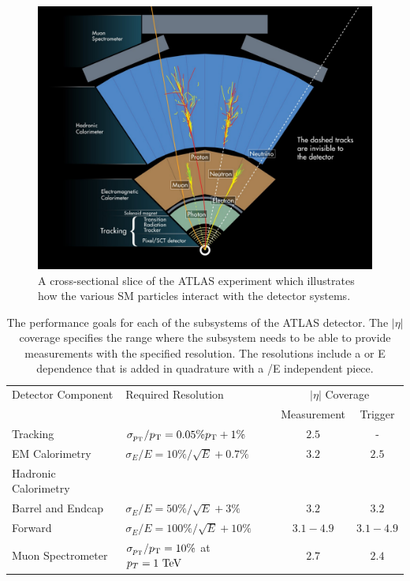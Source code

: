 \begin{figure}[hbtp]
\includegraphics[width=\fullfig]{figures/particle_interactions.png}
\caption{A cross-sectional slice of the ATLAS experiment which illustrates how the various \ac{SM} particles interact with the detector systems.}
\label{fig:particle_interactions}
\end{figure}

\begin{table}
\centering
\begin{tabular}{llcc}
  \hline
  Detector Component & Required Resolution & \multicolumn{2}{c}{$|\eta|$ Coverage} \\
                     &                     & Measurement & Trigger \\
  \hline
  Tracking & $\sigma_{p_{\mathrm{T}}}/p_{\mathrm{T}} = 0.05\% p_{\mathrm{T}} + 1\%$ & $2.5$ & - \\
  EM Calorimetry & $\sigma_{E}/E = 10\%/\sqrt{E} + 0.7\%$ & $3.2$ & $2.5$ \\
  Hadronic Calorimetry & & \\
  \quad Barrel and Endcap & $\sigma_{E}/E = 50\%/\sqrt{E} + 3\%$ & $3.2$ & $3.2$ \\
  \quad Forward & $\sigma_{E}/E = 100\%/\sqrt{E} + 10\%$ & $3.1 - 4.9$ & $3.1 - 4.9$ \\
  Muon Spectrometer & $\sigma_{p_{\mathrm{T}}}/p_{\mathrm{T}} = 10\%$ at $p_T = 1\ \mathrm{Te\kern -0.05em V}$ & $2.7$ & $2.4$ \\
  \hline
\end{tabular}
\caption{The performance goals for each of the subsystems of the ATLAS detector. The $|\eta|$ coverage specifies the range where the subsystem needs to be able to provide measurements with the specified resolution. The resolutions include a \pt or E dependence that is added in quadrature with a \pt/E independent piece.}
\label{tab:performance_goals}
\end{table}

